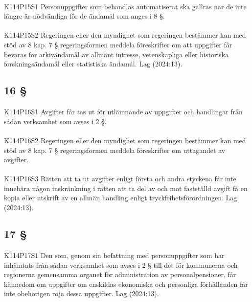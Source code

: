 \documentclass[a4paper,notitlepage,openany,10pt]{book}
\begin{document}
\paragraph*{}
{\tiny K114P15S1}
Personuppgifter som behandlas automatiserat ska gallras när de inte längre är nödvändiga för de ändamål som anges i 8 §.
\paragraph*{}
{\tiny K114P15S2}
Regeringen eller den myndighet som regeringen bestämmer kan med stöd av 8 kap. 7 § regeringsformen meddela föreskrifter om att uppgifter får bevaras för arkivändamål av allmänt intresse, vetenskapliga eller historiska forskningsändamål eller statistiska ändamål.
Lag (2024:13).
\subsection*{16 §}
\paragraph*{}
{\tiny K114P16S1}
Avgifter får tas ut för utlämnande av uppgifter och handlingar från sådan verksamhet som avses i 2 §.
\paragraph*{}
{\tiny K114P16S2}
Regeringen eller den myndighet som regeringen bestämmer kan med stöd av 8 kap. 7 § regeringsformen meddela föreskrifter om uttagandet av avgifter.
\paragraph*{}
{\tiny K114P16S3}
Rätten att ta ut avgifter enligt första och andra styckena får inte innebära någon inskränkning i rätten att ta del av och mot fastställd avgift få en kopia eller utskrift av en allmän handling enligt tryckfrihetsförordningen.
Lag (2024:13).
\subsection*{17 §}
\paragraph*{}
{\tiny K114P17S1}
Den som, genom sin befattning med personuppgifter som har inhämtats från sådan verksamhet som avses i 2 § till det för kommunerna och regionerna gemensamma organet för administration av personalpensioner, får kännedom om uppgifter om enskildas ekonomiska och personliga förhållanden får inte obehörigen röja dessa uppgifter.
Lag (2024:13).
\end{document}
